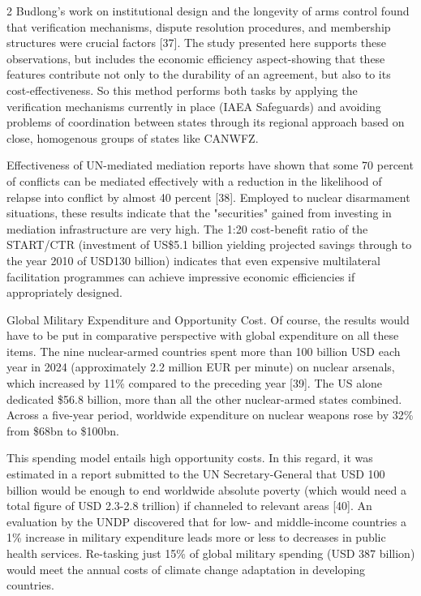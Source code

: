 \begin{multicols}{2}
Budlong's work on institutional design and the longevity of arms control
found that verification mechanisms, dispute resolution procedures, and
membership structures were crucial factors {[}37{]}. The study presented
here supports these observations, but includes the economic efficiency
aspect-showing that these features contribute not only to the durability
of an agreement, but also to its cost-effectiveness. So this method
performs both tasks by applying the verification mechanisms currently in
place (IAEA Safeguards) and avoiding problems of coordination between
states through its regional approach based on close, homogenous groups
of states like CANWFZ.

Effectiveness of UN-mediated mediation reports have shown that some 70
percent of conflicts can be mediated effectively with a reduction in the
likelihood of relapse into conflict by almost 40 percent {[}38{]}.
Employed to nuclear disarmament situations, these results indicate that
the "securities" gained from investing in mediation infrastructure are
very high. The 1:20 cost-benefit ratio of the START/CTR (investment of
US\$5.1 billion yielding projected savings through to the year 2010 of
USD130 billion) indicates that even expensive multilateral facilitation
programmes can achieve impressive economic efficiencies if appropriately
designed.

Global Military Expenditure and Opportunity Cost. Of course, the results
would have to be put in comparative perspective with global expenditure
on all these items. The nine nuclear-armed countries spent more than 100
billion USD each year in 2024 (approximately 2.2 million EUR per minute)
on nuclear arsenals, which increased by 11\% compared to the preceding
year {[}39{]}. The US alone dedicated \$56.8 billion, more than all the
other nuclear-armed states combined. Across a five-year period,
worldwide expenditure on nuclear weapons rose by 32\% from \$68bn to
\$100bn.

This spending model entails high opportunity costs. In this regard, it
was estimated in a report submitted to the UN Secretary-General that USD
100 billion would be enough to end worldwide absolute poverty (which
would need a total figure of USD 2.3-2.8 trillion) if channeled to
relevant areas {[}40{]}. An evaluation by the UNDP discovered that for
low- and middle-income countries a 1\% increase in military expenditure
leads more or less to decreases in public health services. Re-tasking
just 15\% of global military spending (USD 387 billion) would meet the
annual costs of climate change adaptation in developing countries.


\end{multicols}

